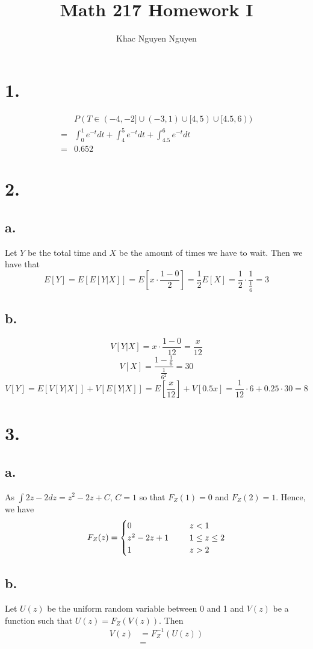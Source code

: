 \documentclass[11pt]{article}
\title{\textbf{Math 217 Homework I}}
\author{Khac Nguyen Nguyen}
\date{}
\begin{document}
\section*{1.}
\begin{equation*}
    \begin{aligned}
        &P(T \in (-4,-2] \cup (-3,1) \cup [4,5) \cup [4.5,6)) \\
        =&\int_0^1  e^{-t} dt +\int_4^5 e^{-t} dt+  \int_{4.5}^6 e^{-t} dt \\
        =& 0.652
    \end{aligned}
\end{equation*}
\pagebreak
\section*{2.}
\subsection*{a.}
Let $Y$ be the total time and $X$ be the amount of times we have to wait. Then we have that
\[
    E[Y] = E[E[Y|X]] = E\left[x \cdot \frac{1-0}{2}\right] = \frac{1}{2} E[X] 
    = \frac{1}{2} \cdot \frac{1}{\frac{1}{6}} = 3
\]
\subsection*{b.}
\[
    V[Y|X] = x \cdot \frac{1-0}{12} = \frac{x}{12}
\]
\[
    V[X] = \frac{1-\frac{1}{6}}{\frac{1}{6^2}} = 30 
\]
\[
    V[Y] = E[V[Y|X]] + V[E[Y|X]] = E[\frac{x}{12}] + V[0.5x] = \frac{1}{12} \cdot 6 + 0.25 \cdot 30 = 8    
\]
\pagebreak
\section*{3.}
\subsection*{a.}
As $\int 2z-2 dz = z^2 - 2z + C$, $C = 1$ so that $F_Z(1) = 0$ and $F_Z(2) = 1$. Hence,  we have
\[
    F_Z(z) = 
    \begin{cases}
        0 \indent & z<1 \\
        z^2-2z+1 \indent &1 \le z \le 2 \\
        1 \indent &z>2
    \end{cases}    
\]
\subsection*{b.}
Let $U(z)$ be the uniform random variable between 0 and 1 and 
$V(z)$ be a function such that $U(z) = F_Z(V(z))$. Then 
\begin{equation*}
    \begin{aligned}
        V(z) 
        &= F^{-1}_Z(U(z)) \\
        &=  
    \end{aligned}
\end{equation*}
\pagebreak
\end{document}

